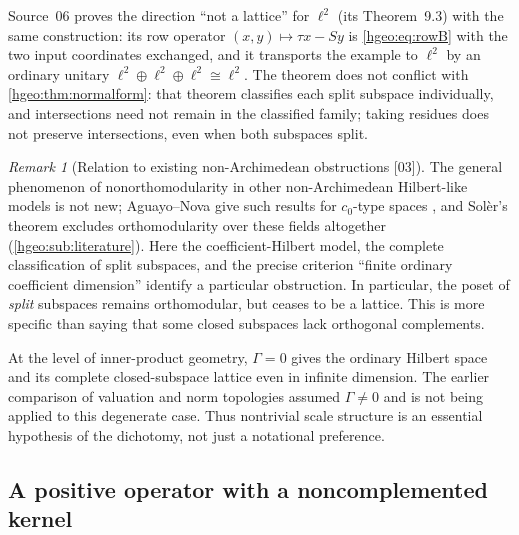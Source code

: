 \documentclass[11pt,letterpaper]{article}
\numberwithin{equation}{section}
\theoremstyle{definition}
\theoremstyle{remark}
\newtheorem{remark}[remark]{Remark}
\newcommand{\src}[1]{\textup{\textsf{\small[#1]}}}
\begin{document}
Source~06 proves the direction ``not a lattice'' for $\ell^2$ (its
Theorem~9.3) with the same construction: its row operator
$(x,y)\mapsto\tau x-Sy$ is \eqref{hgeo:eq:rowB} with the two input
coordinates exchanged, and it transports the example to $\ell^2$ by an
ordinary unitary $\ell^2\oplus\ell^2\oplus\ell^2\cong\ell^2$. The theorem does
not conflict with \cref{hgeo:thm:normalform}: that theorem classifies each
split subspace individually, and intersections need not remain in the
classified family; taking residues does not preserve intersections, even
when both subspaces split.

\begin{remark}[Relation to existing non-Archimedean obstructions \src{03}]
The general phenomenon of nonorthomodularity in other non-Archimedean
Hilbert-like models is not new; Aguayo--Nova give such results for
$c_0$-type spaces \cite{AN}, and Sol\`er's theorem excludes orthomodularity
over these fields altogether (\cref{hgeo:sub:literature}). Here the
coefficient-Hilbert model, the complete classification of split subspaces,
and the precise criterion ``finite ordinary coefficient dimension'' identify a
particular obstruction. In particular, the poset of \emph{split} subspaces
remains orthomodular, but ceases to be a lattice. This is more specific than
saying that some closed subspaces lack orthogonal complements.
\end{remark}

At the level of inner-product geometry, $\Gamma=0$ gives the ordinary
Hilbert space and its complete closed-subspace lattice even in infinite
dimension. The earlier comparison of valuation and norm topologies
assumed $\Gamma\ne0$ and is not being applied to this degenerate case.
Thus nontrivial scale structure is an essential hypothesis of the
dichotomy, not just a notational preference.

\subsection{A positive operator with a noncomplemented kernel}
\end{document}
